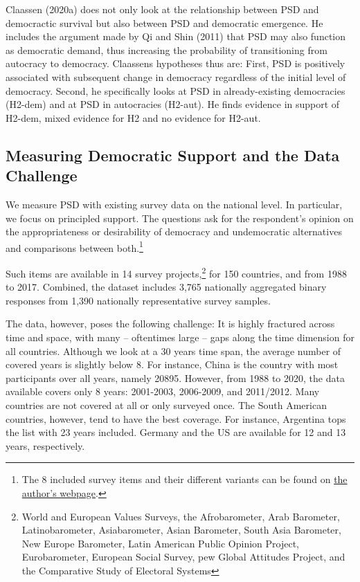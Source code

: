 \documentclass[12pt,english,a4paper,oneside]{article}
\theoremstyle{definition}
\theoremstyle{definition}
\theoremstyle{definition}
\theoremstyle{definition}
\theoremstyle{remark}
\begin{document}
Claassen (2020a) does not only look at the relationship between PSD and democractic survival but also between PSD and democratic emergence. He includes the argument made by Qi and Shin (2011) that PSD may also function as democratic demand, thus increasing the probability of transitioning from autocracy to democracy. Claassens hypotheses thus are: First, PSD is positively associated with subsequent change in democracy regardless of the initial level of democracy. Second, he specifically looks at PSD in already-existing democracies (H2-dem) and at PSD in autocracies (H2-aut). He finds evidence in support of H2-dem, mixed evidence for H2 and no evidence for H2-aut.

\hypertarget{measuring-democratic-support-and-the-data-challenge}{%
\subsection{Measuring Democratic Support and the Data Challenge}\label{measuring-democratic-support-and-the-data-challenge}}

We measure PSD with existing survey data on the national level. In particular, we focus on principled support. The questions ask for the respondent's opinion on the appropriateness or desirability of democracy and undemocratic alternatives and comparisons between both.\footnote{The 8 included survey items and their different variants can be found on \href{http://chrisclaassen.com/docs/Democratic_mood_supp_materials.pdf}{the author's webpage}.}

Such items are available in 14 survey projects,\footnote{World and European Values Surveys, the Afrobarometer, Arab Barometer, Latinobarometer, Asiabarometer, Asian Barometer, South Asia Barometer, New Europe Barometer, Latin American Public Opinion Project, Eurobarometer, European Social Survey, pew Global Attitudes Project, and the Comparative Study of Electoral Systems} for 150 countries, and from 1988 to 2017. Combined, the dataset includes 3,765 nationally aggregated binary responses from 1,390 nationally representative survey samples.

The data, however, poses the following challenge: It is highly fractured across time and space, with many -- oftentimes large -- gaps along the time dimension for all countries. Although we look at a 30 years time span, the average number of covered years is slightly below 8. For instance, China is the country with most participants over all years, namely 20895. However, from 1988 to 2020, the data available covers only 8 years: 2001-2003, 2006-2009, and 2011/2012. Many countries are not covered at all or only surveyed once. The South American countries, however, tend to have the best coverage. For instance, Argentina tops the list with 23 years included. Germany and the US are available for 12 and 13 years, respectively.
\end{document}
